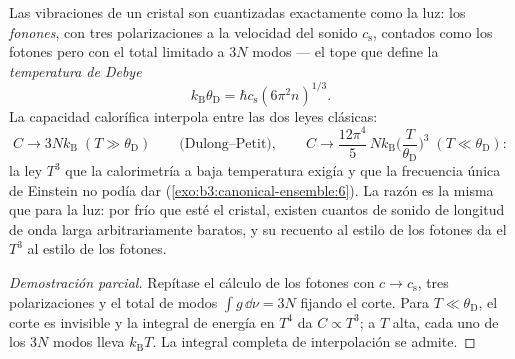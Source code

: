 \begin{theorem}\label{thm:b3:photons-phonons:debye}
Las vibraciones de un cristal son  cuantizadas exactamente como
la luz: los \emph{fonones}, con tres polarizaciones a la velocidad del sonido
$c_{\text{s}}$, contados como los fotones pero con el total limitado a
$3N$ modos --- el tope que define la \emph{temperatura de Debye}
\[
k_{\text{B}}\theta_{\text{D}} = \hbar c_{\text{s}}
(6\pi^2n)^{1/3} .
\]
La capacidad calorífica interpola entre las dos leyes clásicas:
\[
C \to 3Nk_{\text{B}} \;(T \gg \theta_{\text{D}})
\qquad\text{(Dulong--Petit)} ,
\qquad
C \to \frac{12\pi^4}{5}\,Nk_{\text{B}}
\Big(\frac{T}{\theta_{\text{D}}}\Big)^3
\;(T \ll \theta_{\text{D}}) :
\]
la ley $T^3$ que la calorimetría a baja temperatura exigía y que
la frecuencia única de Einstein no podía dar
(\cref{exo:b3:canonical-ensemble:6}). La razón es la misma que
para la luz: por frío que esté el cristal, existen cuantos de sonido de
longitud de onda larga arbitrariamente baratos, y su recuento al estilo de los
fotones da el $T^3$ al estilo de los fotones.
\end{theorem}

\begin{proof}[Demostración parcial]
Repítase el cálculo de los fotones con $c \to c_{\text{s}}$, tres
polarizaciones y el total de modos $\int g\,\dd\nu = 3N$ fijando el
corte. Para $T \ll \theta_{\text{D}}$, el corte es invisible y
la integral de energía en $T^4$ da $C \propto T^3$; a $T$ alta, cada
uno de los $3N$ modos lleva $k_{\text{B}}T$. La integral completa de
interpolación se admite.
\end{proof}

